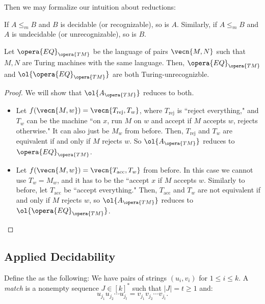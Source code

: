 Then we may formalize our intuition about reductions:

\begin{fact}
	If $A\leq_m B$ and $B$ is decidable (or recognizable), so is $A$. Similarly, if $A\leq_m B$ and $A$ is undecidable (or unrecognizable), so is $B$.
\end{fact}

\begin{thm}
	Let $\opera{EQ}_{\opera{TM}}$ be the language of pairs $\vecn{M,N}$ such that $M,N$ are Turing machines with the same language. Then, $\opera{EQ}_{\opera{TM}}$ and $\ol{\opera{EQ}_{\opera{TM}}}$ are both Turing-unrecognizble.
\end{thm}

\begin{proof}
	We will show that $\ol{A_{\opera{TM}}}$ reduces to both.
	\begin{itemize}
		\item Let $f(\vecn{M,w}) = \vecn{T_{\text{rej}}, T_w}$, where $T_{\text{rej}}$ is ``reject everything," and $T_w$ can be the machine ``on $x$, run $M$ on $w$ and accept if $M$ accepts $w$, rejects otherwise." It can also just be $M_w$ from before. 
			Then, $T_{\text{rej}}$ and $T_w$ are equivalent if and only if $M$ rejects $w$. So $\ol{A_{\opera{TM}}}$ reduces to $\opera{EQ}_{\opera{TM}}$.
		\item Let $f(\vecn{M,w}) = \vecn{T_{\text{acc}}, T_w}$ from before. In this case we cannot use $T_w = M_w$, and it has to be the ``accept $x$ if $M$ accepts $w$. Similarly to before, let $T_{\text{acc}}$ be ``accept everything." Then, $T_{\text{acc}}$ and $T_w$ are not equivalent if and only if $M$ rejects $w$, so $\ol{A_{\opera{TM}}}$ reduces to $\ol{\opera{EQ}_{\opera{TM}}}$.
	\end{itemize}
\end{proof}

\subsection{Applied Decidability}

\begin{defn}
	Define the  as the following: We have pairs of strings $(u_i,v_i)$ for $1\leq i \leq k$. A \emph{match} is a nonempty sequence $J \in [k]^*$ such that $|J| = t\geq 1$ and: \[
		u_{j_1}u_{j_2}\cdots u_{j_t} = v_{j_1} v_{j_2} \cdots v_{j_t}.
	\]
\end{defn}
